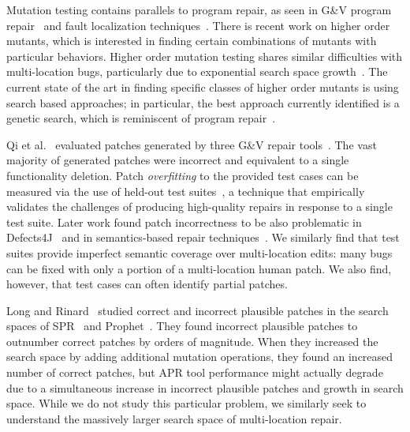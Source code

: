 \documentclass[10pt, conference]{IEEEtran}
\begin{document}
Mutation testing contains parallels to program repair, as seen in G\&V
program repair~\cite{weimer2013leveraging} and fault 
localization techniques~\cite{metallaxis,muse,mbfl-survey}. 
There is recent work on higher order mutants, which is interested in finding 
certain combinations of mutants with particular behaviors. Higher order mutation testing 
shares similar difficulties with multi-location bugs, particularly due to 
exponential search space growth~\cite{long-search-spaces}. 
The current state of the art in finding specific classes of 
higher order mutants is using search based approaches; in particular, the best approach 
currently identified is a genetic search, which is reminiscent of program repair~\cite{homs, 
genprog}.

Qi et al.~\cite{patch-correctness} evaluated patches generated 
by three G\&V repair tools~\cite{genprog, ae, rsrepair}. 
The vast majority of generated patches were incorrect and equivalent to 
a single functionality deletion.  Patch \emph{overfitting} to the provided test
cases can be measured via the use of held-out test
suites~\cite{Smith15fse}, a technique that empirically validates the challenges of producing
high-quality repairs in response to a single test suite.   Later work found patch incorrectness to be 
also problematic in Defects4J~\cite{d4j-eval} and in semantics-based 
repair techniques~\cite{Le2018}.  We similarly find that test suites provide
imperfect semantic coverage over multi-location edits: many bugs can be fixed
with only a portion of a multi-location human patch.  We 
also find, however, that test cases can often identify partial patches. 

Long and Rinard~\cite{long-search-spaces} studied
correct and incorrect plausible patches in the search spaces of SPR~\cite{spr} 
and Prophet~\cite{prophet}. They found incorrect plausible patches to outnumber 
correct patches by orders of magnitude. When they increased the search space 
by adding additional mutation operations, they found an increased number of 
correct patches, but APR tool performance might actually degrade due to a 
simultaneous increase in incorrect plausible patches and growth in search space.  
While we do not study this particular problem, 
we similarly seek to understand the 
massively larger search space of multi-location repair. 
\end{document}
